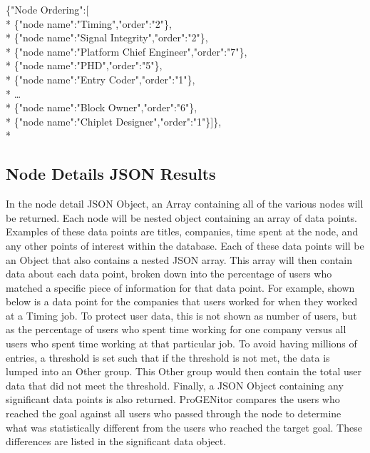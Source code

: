 \noindent \{"Node Ordering":[\\*
	\indent\{"node	name":"Timing","order":"2"\},\\*
	\indent\{"node name":"Signal Integrity","order":"2"\},\\*
	\indent\{"node name":"Platform Chief Engineer","order":"7"\},\\*
	\indent\{"node name":"PHD","order":"5"\},\\*
	\indent\{"node name":"Entry Coder","order":"1"\},\\*
	\indent\ldots\\*
	\indent\{"node name":"Block Owner","order":"6"\},\\*
	\indent\{"node name":"Chiplet Designer","order":"1"\}]\},\\*


\subsection{Node Details JSON Results}
In the node detail JSON Object, an Array containing all of the various nodes
will be returned.  Each node will be nested object containing an array of data
points.  Examples of these data points are titles, companies, time spent at the
node, and any other points of interest within the database.  Each of these data
points will be an Object that also contains a nested JSON array.  This array
will then contain data about each data point, broken down into the percentage of
users who matched a specific piece of information for that data point.  For
example, shown below is a data point for the companies that users worked for
when they worked at a Timing job.  To protect user data, this is not shown as
number of users, but as the percentage of users who spent time working for one
company versus all users who spent time working at that particular job.  To
avoid having millions of entries, a threshold is set such that if the threshold
is not met, the data is lumped into an Other group.  This Other group would then
contain the total user data that did not meet the threshold.  Finally, a JSON
Object containing any significant data points is also returned.  ProGENitor
compares the users who reached the goal against all users who passed through the
node to determine what was statistically different from the users who reached
the target goal.  These differences are listed in the significant data object.

